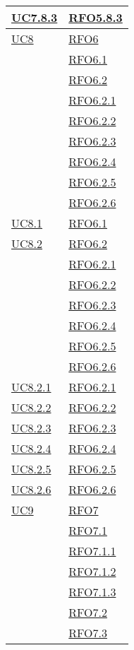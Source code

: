 \begin{longtable}{|>{\centering}m{5cm}|m{5cm}<{\centering}|}
\hyperlink{UC7.8.3}{UC7.8.3} & \hyperlink{RFO5.8.3}{RFO5.8.3}\\\hline
\hyperlink{UC8}{UC8} & \hyperlink{RFO6}{RFO6}\\
& \hyperlink{RFO6.1}{RFO6.1}\\
& \hyperlink{RFO6.2}{RFO6.2}\\
& \hyperlink{RFO6.2.1}{RFO6.2.1}\\
& \hyperlink{RFO6.2.2}{RFO6.2.2}\\
& \hyperlink{RFO6.2.3}{RFO6.2.3}\\
& \hyperlink{RFO6.2.4}{RFO6.2.4}\\
& \hyperlink{RFO6.2.5}{RFO6.2.5}\\
& \hyperlink{RFO6.2.6}{RFO6.2.6}\\\hline
\hyperlink{UC8.1}{UC8.1} & \hyperlink{RFO6.1}{RFO6.1}\\\hline
\hyperlink{UC8.2}{UC8.2} & \hyperlink{RFO6.2}{RFO6.2}\\
& \hyperlink{RFO6.2.1}{RFO6.2.1}\\
& \hyperlink{RFO6.2.2}{RFO6.2.2}\\
& \hyperlink{RFO6.2.3}{RFO6.2.3}\\
& \hyperlink{RFO6.2.4}{RFO6.2.4}\\
& \hyperlink{RFO6.2.5}{RFO6.2.5}\\
& \hyperlink{RFO6.2.6}{RFO6.2.6}\\\hline
\hyperlink{UC8.2.1}{UC8.2.1} & \hyperlink{RFO6.2.1}{RFO6.2.1}\\\hline
\hyperlink{UC8.2.2}{UC8.2.2} & \hyperlink{RFO6.2.2}{RFO6.2.2}\\\hline
\hyperlink{UC8.2.3}{UC8.2.3} & \hyperlink{RFO6.2.3}{RFO6.2.3}\\\hline
\hyperlink{UC8.2.4}{UC8.2.4} & \hyperlink{RFO6.2.4}{RFO6.2.4}\\\hline
\hyperlink{UC8.2.5}{UC8.2.5} & \hyperlink{RFO6.2.5}{RFO6.2.5}\\\hline
\hyperlink{UC8.2.6}{UC8.2.6} & \hyperlink{RFO6.2.6}{RFO6.2.6}\\\hline
\hyperlink{UC9}{UC9} & \hyperlink{RFO7}{RFO7}\\
& \hyperlink{RFO7.1}{RFO7.1}\\
& \hyperlink{RFO7.1.1}{RFO7.1.1}\\
& \hyperlink{RFO7.1.2}{RFO7.1.2}\\
& \hyperlink{RFO7.1.3}{RFO7.1.3}\\
& \hyperlink{RFO7.2}{RFO7.2}\\
& \hyperlink{RFO7.3}{RFO7.3}\\

\end{longtable}
